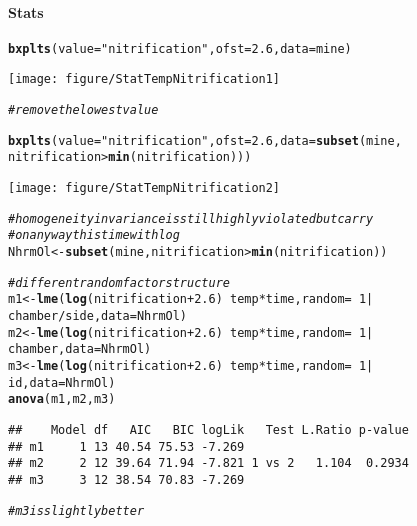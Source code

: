 \documentclass[11pt]{article}\usepackage[]{graphicx}\usepackage[]{color}
\makeatletter
\def\maxwidth{ %
  \ifdim\Gin@nat@width>\linewidth
    \linewidth
  \else
    \Gin@nat@width
  \fi
}
\newcommand{\hlnum}[1]{\textcolor[rgb]{0.686,0.059,0.569}{#1}}%
\newcommand{\hlstr}[1]{\textcolor[rgb]{0.192,0.494,0.8}{#1}}%
\newcommand{\hlcom}[1]{\textcolor[rgb]{0.678,0.584,0.686}{\textit{#1}}}%
\newcommand{\hlopt}[1]{\textcolor[rgb]{0,0,0}{#1}}%
\newcommand{\hlstd}[1]{\textcolor[rgb]{0.345,0.345,0.345}{#1}}%
\newcommand{\hlkwb}[1]{\textcolor[rgb]{0.69,0.353,0.396}{#1}}%
\newcommand{\hlkwc}[1]{\textcolor[rgb]{0.333,0.667,0.333}{#1}}%
\newcommand{\hlkwd}[1]{\textcolor[rgb]{0.737,0.353,0.396}{\textbf{#1}}}%
\newenvironment{kframe}{%
 \def\at@end@of@kframe{}%
 \ifinner\ifhmode%
  \def\at@end@of@kframe{\end{minipage}}%
  \begin{minipage}{\columnwidth}%
 \fi\fi%
 \def\FrameCommand##1{\hskip\@totalleftmargin \hskip-\fboxsep
 \colorbox{shadecolor}{##1}\hskip-\fboxsep
     \hskip-\linewidth \hskip-\@totalleftmargin \hskip\columnwidth}%
 \MakeFramed {\advance\hsize-\width
   \@totalleftmargin\z@ \linewidth\hsize
   \@setminipage}}%
 {\par\unskip\endMakeFramed%
 \at@end@of@kframe}
\newenvironment{knitrout}{}{} %
\makeatother
\begin{document}
\paragraph{Stats}
\noindent

\begin{knitrout}
\color{fgcolor}\begin{kframe}
\begin{alltt}
\hlkwd{bxplts}\hlstd{(}\hlkwc{value} \hlstd{=} \hlstr{"nitrification"}\hlstd{,} \hlkwc{ofst} \hlstd{=} \hlnum{2.6}\hlstd{,} \hlkwc{data} \hlstd{= mine)}
\end{alltt}
\end{kframe}
\texttt{[image: figure/StatTempNitrification1]} 
\begin{kframe}\begin{alltt}
\hlcom{# remove the lowest value}

\hlkwd{bxplts}\hlstd{(}\hlkwc{value} \hlstd{=} \hlstr{"nitrification"}\hlstd{,} \hlkwc{ofst} \hlstd{=} \hlnum{2.6}\hlstd{,} \hlkwc{data} \hlstd{=} \hlkwd{subset}\hlstd{(mine,}
    \hlstd{nitrification} \hlopt{>} \hlkwd{min}\hlstd{(nitrification)))}
\end{alltt}
\end{kframe}
\texttt{[image: figure/StatTempNitrification2]} 
\begin{kframe}\begin{alltt}
\hlcom{# homogeneity in variance is still highly violated but carry}
\hlcom{# on anyway this time with log}
\hlstd{NhrmOl} \hlkwb{<-} \hlkwd{subset}\hlstd{(mine, nitrification} \hlopt{>} \hlkwd{min}\hlstd{(nitrification))}


\hlcom{# different random factor structure}
\hlstd{m1} \hlkwb{<-} \hlkwd{lme}\hlstd{(}\hlkwd{log}\hlstd{(nitrification} \hlopt{+} \hlnum{2.6}\hlstd{)} \hlopt{~} \hlstd{temp} \hlopt{*} \hlstd{time,} \hlkwc{random} \hlstd{=} \hlopt{~}\hlnum{1} \hlopt{|}
    \hlstd{chamber}\hlopt{/}\hlstd{side,} \hlkwc{data} \hlstd{= NhrmOl)}
\hlstd{m2} \hlkwb{<-} \hlkwd{lme}\hlstd{(}\hlkwd{log}\hlstd{(nitrification} \hlopt{+} \hlnum{2.6}\hlstd{)} \hlopt{~} \hlstd{temp} \hlopt{*} \hlstd{time,} \hlkwc{random} \hlstd{=} \hlopt{~}\hlnum{1} \hlopt{|}
    \hlstd{chamber,} \hlkwc{data} \hlstd{= NhrmOl)}
\hlstd{m3} \hlkwb{<-} \hlkwd{lme}\hlstd{(}\hlkwd{log}\hlstd{(nitrification} \hlopt{+} \hlnum{2.6}\hlstd{)} \hlopt{~} \hlstd{temp} \hlopt{*} \hlstd{time,} \hlkwc{random} \hlstd{=} \hlopt{~}\hlnum{1} \hlopt{|}
    \hlstd{id,} \hlkwc{data} \hlstd{= NhrmOl)}
\hlkwd{anova}\hlstd{(m1, m2, m3)}
\end{alltt}
\begin{verbatim}
##    Model df   AIC   BIC logLik   Test L.Ratio p-value
## m1     1 13 40.54 75.53 -7.269                       
## m2     2 12 39.64 71.94 -7.821 1 vs 2   1.104  0.2934
## m3     3 12 38.54 70.83 -7.269
\end{verbatim}
\begin{alltt}
\hlcom{# m3 is slight ly better}


\end{alltt}
\end{kframe}
\end{knitrout}
\end{document}
